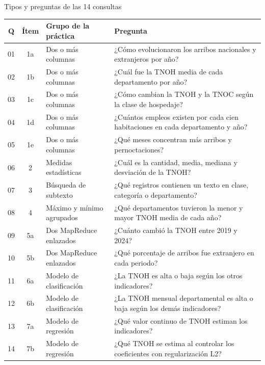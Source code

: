 \documentclass{beamer}
\begin{document}
\begin{frame}{Tipos y preguntas de las 14 consultas}
\tiny
\setlength{\tabcolsep}{3pt}
\renewcommand{\arraystretch}{1.08}
\begin{tabularx}{\textwidth}{c c p{} X}
\toprule
\textbf{Q} & \textbf{Ítem} & \textbf{Grupo de la práctica} & \textbf{Pregunta} \\
\midrule
01 & 1a & Dos o más columnas & ¿Cómo evolucionaron los arribos nacionales y extranjeros por año? \\
02 & 1b & Dos o más columnas & ¿Cuál fue la TNOH media de cada departamento por año? \\
03 & 1c & Dos o más columnas & ¿Cómo cambian la TNOH y la TNOC según la clase de hospedaje? \\
04 & 1d & Dos o más columnas & ¿Cuántos empleos existen por cada cien habitaciones en cada departamento y año? \\
05 & 1e & Dos o más columnas & ¿Qué meses concentran más arribos y pernoctaciones? \\
06 & 2 & Medidas estadísticas & ¿Cuál es la cantidad, media, mediana y desviación de la TNOH? \\
07 & 3 & Búsqueda de subtexto & ¿Qué registros contienen un texto en clase, categoría o departamento? \\
08 & 4 & Máximo y mínimo agrupados & ¿Qué departamentos tuvieron la menor y mayor TNOH media de cada año? \\
09 & 5a & Dos MapReduce enlazados & ¿Cuánto cambió la TNOH entre 2019 y 2024? \\
10 & 5b & Dos MapReduce enlazados & ¿Qué porcentaje de arribos fue extranjero en cada periodo? \\
11 & 6a & Modelo de clasificación & ¿La TNOH es alta o baja según los otros indicadores? \\
12 & 6b & Modelo de clasificación & ¿La TNOH mensual departamental es alta o baja según los demás indicadores? \\
13 & 7a & Modelo de regresión & ¿Qué valor continuo de TNOH estiman los indicadores? \\
14 & 7b & Modelo de regresión & ¿Qué TNOH se estima al controlar los coeficientes con regularización L2? \\
\bottomrule
\end{tabularx}
\end{frame}
\end{document}
